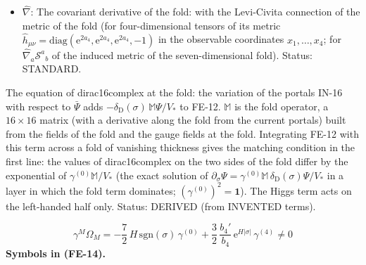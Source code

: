 \documentclass[
  10pt,
]{article}
\begin{document}
\begin{itemize}
  \(D_M,\ D_\mu\): The covariant derivative: on dirac16complex
  \(D_M = \partial_M + \Omega_M\) (with
  \(D_M\bar\Psi = \partial_M\bar\Psi - \bar\Psi\Omega_M\)); on the
  fields of the fold the gauge and spin covariant derivative \(D_\mu\)
  (the partial derivative plus the spin connection of the fold and the
  gauge fields times their couplings and generators);
  \(D^\mu = \hat h^{\mu\nu}D_\nu\); on an adjoint field
  \((D_\mu X)^A = \partial_\mu X^A + g_3f^{ABC}G^B_\mu X^C\) (likewise
  for \(SU(2)\) with \(g_2\epsilon^{IJK}\)). Unit: 1/length. Status:
  STANDARD.
\item
  \(\hat\nabla\): The covariant derivative of the fold: with the
  Levi-Civita connection of the metric of the fold (for four-dimensional
  tensors of its metric
  \(\hat h_{\mu\nu} = \mathrm{diag}(\mathrm{e}^{2a_4}, \mathrm{e}^{2a_4}, \mathrm{e}^{2a_4}, -1)\)
  in the observable coordinates \(x_1, \dots, x_4\); for
  \(\hat\nabla_a\mathcal{S}^a{}_b\) of the induced metric of the
  seven-dimensional fold). Status: STANDARD.
\end{itemize}

The equation of dirac16complex at the fold: the variation of the portals
IN-16 with respect to \(\bar\Psi\) adds
\(-\delta_{\mathrm{D}}(\sigma)\,\mathbb{M}\Psi/V_*\) to FE-12.
\(\mathbb{M}\) is the fold operator, a \(16 \times 16\) matrix (with a
derivative along the fold from the current portals) built from the
fields of the fold and the gauge fields at the fold. Integrating FE-12
with this term across a fold of vanishing thickness gives the matching
condition in the first line: the values of dirac16complex on the two
sides of the fold differ by the exponential of
\(\gamma^{(0)}\mathbb{M}/V_*\) (the exact solution of
\(\partial_\sigma\Psi = \gamma^{(0)}\mathbb{M}\,\delta_{\mathrm{D}}(\sigma)\Psi/V_*\)
in a layer in which the fold term dominates;
\((\gamma^{(0)})^2 = \mathbf{1}\)). The Higgs term acts on the
left-handed half only. Status: DERIVED (from INVENTED terms).

\[
\gamma^M\Omega_M = -\frac72\,H\,\mathrm{sgn}(\sigma)\,\gamma^{(0)} + \frac32\,\frac{b_4'}{b_4}\,\mathrm{e}^{H\lvert\sigma\rvert}\,\gamma^{(4)} \ne 0 \tag{FE-14}
\] \textbf{Symbols in (FE-14).}
\end{document}
